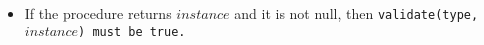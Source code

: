 \begin{itemize}

\item If the procedure returns $instance$ and it is not null,
then \tt{validate(type,} $instance$\tt{)} must be \tt{true}.

\end{itemize}
